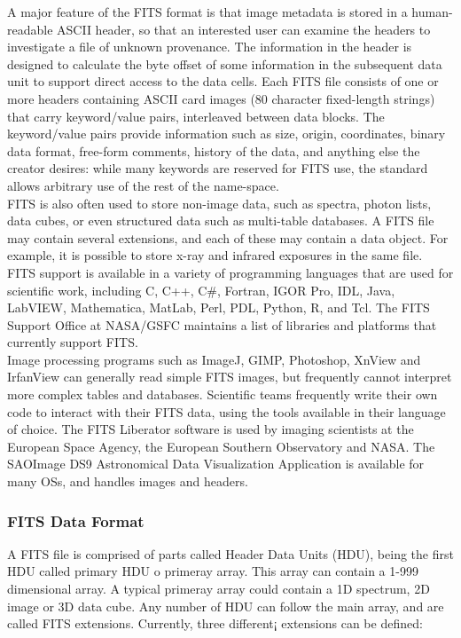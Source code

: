 A major feature of the FITS format is that image metadata is stored in a human-readable ASCII header, so that an interested user can examine the headers to investigate a file of unknown provenance. The information in the header is designed to calculate the byte offset of some information in the subsequent data unit to support direct access to the data cells. Each FITS file consists of one or more headers containing ASCII card images (80 character fixed-length strings) that carry keyword/value pairs, interleaved between data blocks. The keyword/value pairs provide information such as size, origin, coordinates, binary data format, free-form comments, history of the data, and anything else the creator desires: while many keywords are reserved for FITS use, the standard allows arbitrary use of the rest of the name-space.\\
 
FITS is also often used to store non-image data, such as spectra, photon lists, data cubes, or even structured data such as multi-table databases. A FITS file may contain several extensions, and each of these may contain a data object. For example, it is possible to store x-ray and infrared exposures in the same file.\\
 
FITS support is available in a variety of programming languages that are used for scientific work, including C, C++, C\#, Fortran, IGOR Pro, IDL, Java, LabVIEW, Mathematica, MatLab, Perl, PDL, Python, R, and Tcl. The FITS Support Office at NASA/GSFC maintains a list of libraries and platforms that currently support FITS.\\
 
Image processing programs such as ImageJ, GIMP, Photoshop, XnView and IrfanView can generally read simple FITS images, but frequently cannot interpret more complex tables and databases. Scientific teams frequently write their own code to interact with their FITS data, using the tools available in their language of choice. The FITS Liberator software is used by imaging scientists at the European Space Agency, the European Southern Observatory and NASA. The SAOImage DS9 Astronomical Data Visualization Application is available for many OSs, and handles images and headers.

\subsubsection{FITS Data Format}

A FITS file is comprised of parts called Header Data Units (HDU), being the first HDU called primary HDU o primeray array. This array can contain a 1-999 dimensional array. A typical primeray array could contain a 1D spectrum, 2D image or 3D data cube. Any number of HDU can follow the main array, and are called FITS extensions. Currently, three different¡ extensions can be defined:

